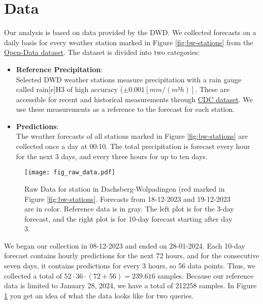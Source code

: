 \documentclass{article}
\theoremstyle{plain}
\theoremstyle{definition}
\theoremstyle{remark}
\begin{document}
\section{Data}\label{sec:Data}
Our analysis is based on data provided by the DWD. We collected forecasts on a
daily basis for every weather station marked in Figure \ref{fig:bw-stations}
from the \href{https://opendata.dwd.de/climate_environment/CDC/}{Open-Data
    dataset}. The dataset is divided into two categories:
\begin{itemize}
    \item \textbf{Reference Precipitation}:\\
          Selected DWD weather stations measure precipitation with a rain gauge
          called rain[e]H3 \cite{rain-e} of high accuracy ($\pm 0.001 [mm/(m²h)]$. These
          are accessible for recent and historical measurements through
          \href{https://opendata.dwd.de/climate_environment/CDC/observations_germany/climate/hourly/precipitation/}{CDC
              dataset}. We use these measurements as a reference to the forecast for each
          station.

    \item \textbf{Predictions}:\\
          The weather forecasts of all stations marked in Figure
          \ref{fig:bw-stations} are collected once a day at 00:10. The total
          precipitation is forecast every hour for the next 3 days, and every three hours
          for up to ten days.
\end{itemize}
\begin{figure}
    \centering
    \texttt{[image: fig\_raw\_data.pdf]}
    \caption{Raw Data for station in Dachsberg-Wolpadingen (red marked in
        Figure \ref{fig:bw-stations}. Forecasts from 18-12-2023 and 19-12-2023 are in
        color. Reference data is in gray. The left plot is for the 3-day forecast, and
        the right plot is for 10-day forecast starting after day 3. }
    \label{fig:dec_diff_call_times}
\end{figure}
We began our collection in 08-12-2023 and ended on 28-01-2024.
Each 10-day forecast contains hourly predictions for the next 72 hours, and for
the consecutive seven days, it contains predictions for every 3 hours, so 56
data points.
Thus, we collected a total of $52 \cdot 36 \cdot (72 + 56) = 239.616$ samples.
Because our reference data is limited to January 28, 2024, we have a total of
212258 samples.
In Figure \ref{fig:dec_diff_call_times} you get an idea of what the data looks
like for two queries.
\end{document}
